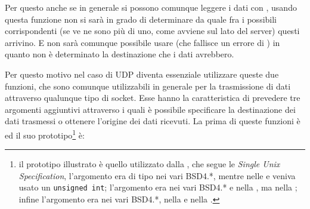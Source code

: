 Per questo anche se in generale si possono comunque leggere i dati con
, usando questa funzione non si sarà in grado di determinare da
quale fra i possibili corrispondenti (se ve ne sono più di uno, come avviene
sul lato del server) questi arrivino. E non sarà comunque possibile usare
 (che fallisce un errore di ) in quanto non
è determinato la destinazione che i dati avrebbero.

Per questo motivo nel caso di UDP diventa essenziale utilizzare queste due
funzioni, che sono comunque utilizzabili in generale per la trasmissione di
dati attraverso qualunque tipo di socket. Esse hanno la caratteristica di
prevedere tre argomenti aggiuntivi attraverso i quali è possibile specificare
la destinazione dei dati trasmessi o ottenere l'origine dei dati ricevuti. La
prima di queste funzioni è  ed il suo prototipo\footnote{il
  prototipo illustrato è quello utilizzato dalla , che segue le
  \textit{Single Unix Specification}, l'argomento  era di tipo
   nei vari BSD4.*, mentre nelle  e  veniva
  usato un \texttt{unsigned int}; l'argomento  era  nei
  vari BSD4.* e nella , ma  nella ; infine
  l'argomento  era  nei vari BSD4.*, nella  e
  nella .} è:
